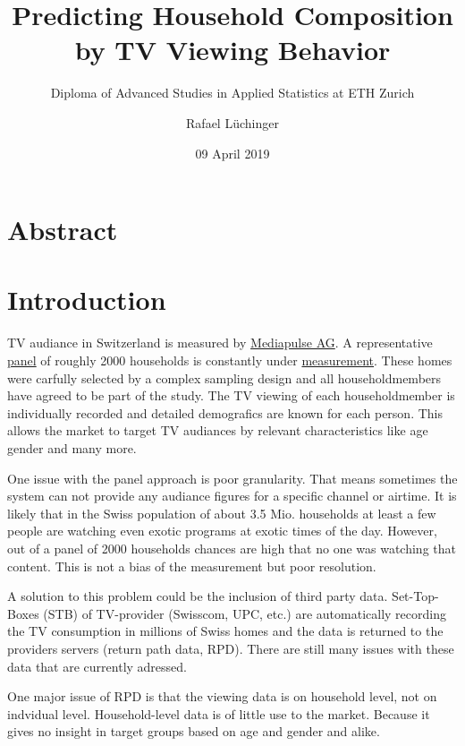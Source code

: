 \documentclass[]{article}
\title{Predicting Household Composition by TV Viewing Behavior}
\subtitle{Diploma of Advanced Studies in Applied Statistics at ETH Zurich}
\author{Rafael Lüchinger}
\date{09 April 2019}
\begin{document}
\maketitle

{
\setcounter{tocdepth}{2}
\tableofcontents
}
\section{Abstract}\label{abstract}

\section{Introduction}\label{introduction}

TV audiance in Switzerland is measured by
\href{https:://www.mediapulse.ch/en}{Mediapulse AG}. A representative
\href{https:://www.mediapulse.ch/en/tv/research-method/the-panel.html}{panel}
of roughly 2000 households is constantly under
\href{https:://www.mediapulse.ch/en/tv/research-method/the-measuring-technique.html}{measurement}.
These homes were carfully selected by a complex sampling design and all
householdmembers have agreed to be part of the study. The TV viewing of
each householdmember is individually recorded and detailed demografics
are known for each person. This allows the market to target TV audiances
by relevant characteristics like age gender and many more.

One issue with the panel approach is poor granularity. That means
sometimes the system can not provide any audiance figures for a specific
channel or airtime. It is likely that in the Swiss population of about
3.5 Mio. households at least a few people are watching even exotic
programs at exotic times of the day. However, out of a panel of 2000
households chances are high that no one was watching that content. This
is not a bias of the measurement but poor resolution.

A solution to this problem could be the inclusion of third party data.
Set-Top-Boxes (STB) of TV-provider (Swisscom, UPC, etc.) are
automatically recording the TV consumption in millions of Swiss homes
and the data is returned to the providers servers (return path data,
RPD). There are still many issues with these data that are currently
adressed.

One major issue of RPD is that the viewing data is on household level,
not on indvidual level. Household-level data is of little use to the
market. Because it gives no insight in target groups based on age and
gender and alike.
\end{document}
